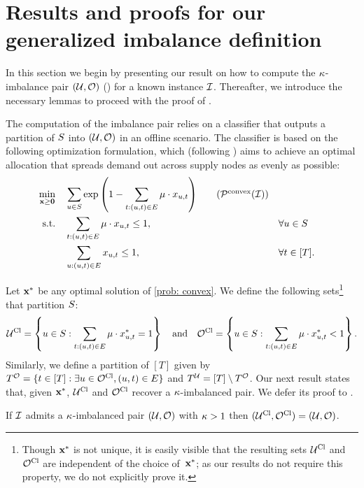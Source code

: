 \section{Results and proofs for our generalized imbalance definition}
\setcounter{proposition}{0}
\label{sec: alternative_def}
In this section we begin by presenting our result on how to compute the $\kappa$-imbalance pair $(\mathcal U, \mathcal O)$ () for a known instance $\mathcal I$.  Thereafter, we introduce the necessary lemmas to proceed with the proof of .

 The computation of the imbalance pair relies on a classifier that outputs a partition of $S$ into $(\mathcal U, \mathcal{O})$ in an offline scenario. The classifier is based on the following optimization formulation, which (following \citet{feng2024two}) aims to achieve an optimal allocation that spreads demand out across supply nodes as evenly as possible:
\begin{align*}
             \min_{\mathbf{x}\geq \mathbf{0}} \quad & \sum_{u \in \supply}{ \exp\left( 1- \sum_{t: (u, t) \in E} \prob \cdot x_{u, t} \right)} \tag{\(\mathcal{P}^{\mathrm{convex}}(\inst)\)} \label{prob: convex}\\
    \textrm{s.t.} \quad & \sum_{t: (u,t) \in E } \prob \cdot  x_{u, t} \leq 1, \quad && \forall u \in \supply \\
    & \sum_{u: (u,t) \in E} x_{u, t} \leq 1, \quad && \forall t \in [T].
\end{align*}

Let $\mathbf{x}^*$ be any optimal solution of \ref{prob: convex}. We define the following sets\footnote{Though $\mathbf{x}^*$ is not unique, it is easily visible that the resulting sets $\mathcal U^{\mathrm{Cl}}$ and $\mathcal O^{\mathrm{Cl}}$ are independent of the choice of~$\mathbf{x}^*$; as our results do not require this property, we do not explicitly prove it.} that partition $S$:
\begin{equation*}
    \mathcal U^{\mathrm{Cl}} = \left\{ u \in S : \sum_{t: (u,t) \in E} \mu 
 \cdot x^*_{u,t} = 1  \right\} \quad \text{and} \quad \mathcal O^{\mathrm{Cl}} =  \left\{ u \in S : \sum_{t: (u,t) \in E} \mu 
 \cdot x^*_{u,t} < 1  \right\}.
\end{equation*}
Similarly, we define a partition of 
$[T]$ given by $T^{\mathcal O} = \{ t \in [T]: \exists u \in \mathcal O^{\mathrm{Cl}}, (u,t) \in E \}$ and $T^{\mathcal U} = [T] \setminus T^{\mathcal O}$.
Our next result states that, given $\mathbf{x}^*$, $\mathcal U^{\mathrm{Cl}}$ and $\mathcal O^{\mathrm{Cl}}$ recover a $\kappa$-imbalanced pair. We defer its proof to .
\begin{proposition}
    \label{prop: k-imbalanced result}
    {If} %
    $\mathcal I$ admits a $\kappa$-imbalanced pair $(\mathcal U, \mathcal O)$ with $\kappa > 1$ then $(\mathcal U^{\mathrm{Cl}}, \mathcal O^{\mathrm{Cl}}) = (\mathcal U, \mathcal O)$. 
\end{proposition}

